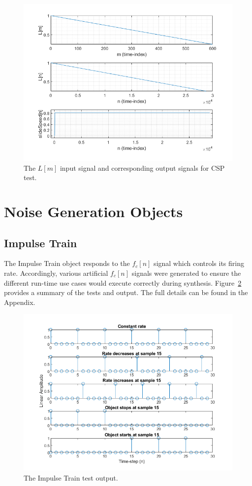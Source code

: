 \documentclass[../main.tex]{subfiles}
\begin{document}
\begin{figure}[h]
    \centering
    \includegraphics[scale=.65]{./images/plots/CSPTest.png}
    \caption{The $L[m]$ input signal and corresponding output signals for CSP test.}
    \label{fig:CSPTest}
\end{figure}

\clearpage

\section{Noise Generation Objects}
\subsection{Impulse Train}
The Impulse Train object responds to the $f_c[n]$ signal which controls its firing rate. Accordingly, various artificial $f_c[n]$ signals were generated to ensure the different run-time use cases would execute correctly during synthesis. Figure~\ref{fig:ImpulseTrainTest} provides a summary of the tests and output. The full details can be found in the Appendix. 

\begin{figure}[h]
    \centering
    \includegraphics[scale=.65]{./images/plots/ImpulseTrainTest.png}
    \caption{The Impulse Train test output.}
    \label{fig:ImpulseTrainTest}
\end{figure}
\end{document}
